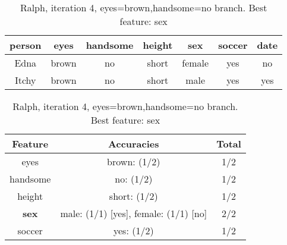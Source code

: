 \begin{table}[h!]
  \centering
  \begin{tabular}{cccccc|c}
    \toprule
    person      & eyes  & handsome & height & sex    & soccer & date\\
    \midrule
    Edna        & brown & no       & short  & female & yes    & no  \\
    Itchy       & brown & no       & short  & male   & yes    & yes \\
    \bottomrule
  \end{tabular}

  \vspace{.5cm}

  \begin{tabular}{ccc}
    \toprule
    Feature           & Accuracies                            & Total\\
    \midrule
    eyes              & brown: (1/2)                          & 1/2\\
    handsome          & no: (1/2)                             & 1/2\\
    height            & short: (1/2)                          & 1/2\\
    \textbf{sex}      & male: (1/1) [yes], female: (1/1) [no] & 2/2\\
    soccer            & yes: (1/2)                            & 1/2\\
    \bottomrule
  \end{tabular}
  \caption*{Ralph, iteration 4, eyes=brown,handsome=no branch. Best feature: sex}
\end{table}

